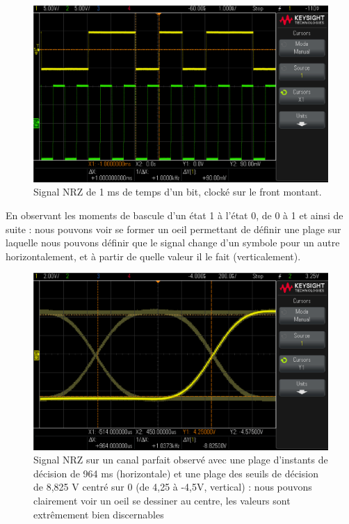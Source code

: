 \begin{figure}[H]
      \centering
      \includegraphics[width=\textwidth - \textwidth / 5]{ressources/r305/02.png}
      \caption{Signal NRZ de 1 ms de temps d'un bit, clocké sur le front montant.}
      \label{fig:r3053}
\end{figure}

\noindent En observant les moments de bascule d'un état 1 à l'état 0, de 0 à 1 et ainsi de suite : nous pouvons voir se former un oeil permettant de définir une plage sur laquelle nous pouvons définir que le signal change d'un symbole pour un autre horizontalement, et à partir de quelle valeur il le fait (verticalement).

\begin{figure}[H]
      \centering
      \includegraphics[width=\textwidth - \textwidth / 4]{ressources/r305/03.png}
      \caption{Signal NRZ sur un canal parfait observé avec une plage d'instants de décision de 964 ms (horizontale) et une plage des seuils de décision de 8,825 V centré sur 0 (de 4,25 à -4,5V, vertical) : nous pouvons clairement voir un oeil se dessiner au centre, les valeurs sont extrêmement bien discernables}
      \label{fig:r3053}
\end{figure}

